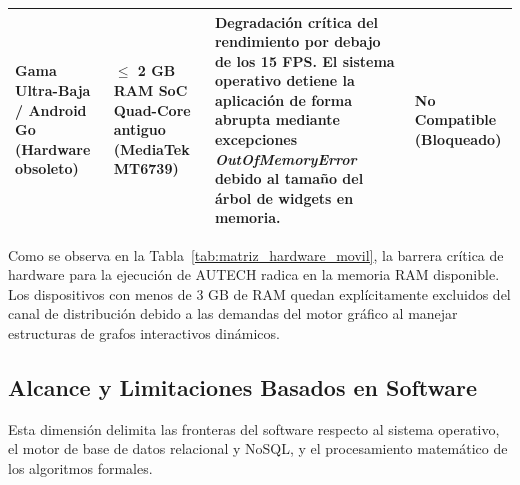 \begin{table}[htbp]
\begin{tabularx}{\textwidth}{@{} >{\raggedright\arraybackslash}p{2.8cm} >{\raggedright\arraybackslash}p{2.4cm} >{\raggedright\arraybackslash}X >{\raggedleft\arraybackslash}p{3cm} @{}}
\textbf{Gama Ultra-Baja / Android Go} \newline (Hardware obsoleto)
  & $\le$ 2 GB RAM \newline SoC Quad-Core antiguo \newline (MediaTek MT6739)
  & Degradación crítica del rendimiento por debajo de los 15 FPS. El sistema operativo detiene la aplicación de forma abrupta mediante excepciones \textit{OutOfMemoryError} debido al tamaño del árbol de widgets en memoria.
  & \textcolor{red!70!black}{\textbf{No Compatible \newline (Bloqueado)}} \\
\bottomrule
\end{tabularx}
\end{table}

Como se observa en la Tabla~\ref{tab:matriz_hardware_movil}, la barrera crítica de hardware para la ejecución de AUTECH radica en la memoria RAM disponible. Los dispositivos con menos de 3 GB de RAM quedan explícitamente excluidos del canal de distribución debido a las demandas del motor gráfico al manejar estructuras de grafos interactivos dinámicos.

\subsection{Alcance y Limitaciones Basados en Software}
\label{subsec:alcance_limitaciones_software}

Esta dimensión delimita las fronteras del software respecto al sistema operativo, el motor de base de datos relacional y NoSQL, y el procesamiento matemático de los algoritmos formales.

